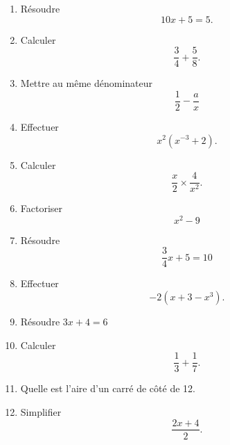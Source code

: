 \begin{exercice}
\begin{multicols}{2}
\begin{enumerate}
        \item
            Résoudre
            \begin{equation}
                10x+5=5.
            \end{equation}
        \item
            Calculer
            \begin{equation}
                \frac{ 3 }{ 4 }+\frac{ 5 }{ 8 }.
            \end{equation}
        \item
            Mettre au même dénominateur
            \begin{equation}
                \frac{ 1 }{ 2 }-\frac{ a }{ x }
            \end{equation}
        \item
            Effectuer
            \begin{equation}
                x^2(x^{-3}+2).
            \end{equation}

        \item
            Calculer
            \begin{equation}
                \frac{ x }{ 2 }\times\frac{ 4 }{ x^2 }.
            \end{equation}
        \item
            Factoriser
            \begin{equation}
                x^2-9
            \end{equation}
        \item
            Résoudre
            \begin{equation}
                \frac{ 3 }{ 4 }x+5=10
            \end{equation}
        \item
            Effectuer
            \begin{equation}
                -2(x+3-x^3).
            \end{equation}

        \item
            Résoudre \( 3x+4=6\)
        \item
            Calculer
            \begin{equation}
                \frac{1}{ 3 }+\frac{1}{ 7 }.
            \end{equation}
        \item
            Quelle est l'aire d'un carré de côté de \unit{12}{\centi\meter\squared}.
        \item
            Simplifier
            \begin{equation}
                \frac{ 2x+4 }{ 2 }.
            \end{equation}



\end{enumerate}
\end{multicols}
\end{exercice}
